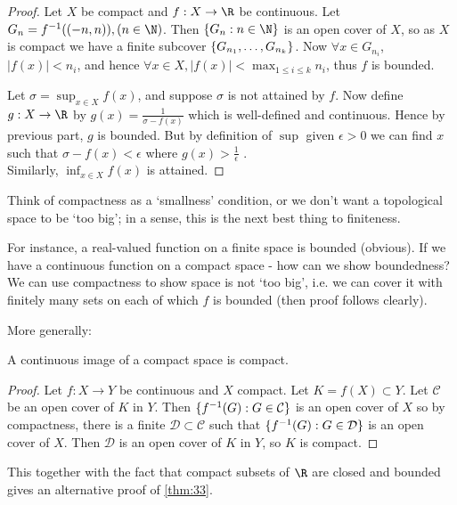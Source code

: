 \begin{proof}
Let $X$ be compact and $f:X \to \R$ be continuous. Let $G_n = f\inv((-n,n)) , (n\in \N)$. Then $\Set{G_n}{n\in \N}$ is an open cover of $X$, so as $X$ is compact we have a finite subcover $\{G_{n_1},\dots, G_{n_k}\}$. Now $\forall x\in G_{n_i}$, $|f(x)| < n_i$, and hence $\forall x\in X, |f(x)| < \max_{1 \leq i  \leq k} n_i$, thus $f$ is bounded.

Let $\sigma = \sup_{x\in X} f(x)$, and suppose $\sigma$ is not attained by $f$. Now define $g: X \to \R$ by $g(x) = \frac{1}{\sigma-f(x)}$ which is well-defined and continuous. Hence by previous part, $g$ is bounded. But by definition of $\sup$ given $\epsilon>0$ we can find $x$ such that $\sigma - f(x)< \epsilon$ where $g(x) > \frac{1}{\epsilon}$ \Lightning. \\
Similarly, $\inf_{x\in X} f(x)$ is attained.
\end{proof}

\begin{remark}
Think of compactness as a `smallness' condition, or we don't want a topological space to be `too big'; in a sense, this is the next best thing to finiteness.

For instance, a real-valued function on a finite space is bounded (obvious). If we have a continuous function on a compact space - how can we show boundedness? We can use compactness to show space is not `too big', i.e. we can cover it with finitely many sets on each of which $f$ is bounded (then proof follows clearly).
\end{remark}

More generally:
\begin{theorem} \label{thm:34}      
A continuous image of a compact space is compact.
\end{theorem}

\begin{proof} 
Let $f: X \to Y$ be continuous and $X$ compact. Let $K=f(X)\subset Y$. Let $\mathcal{C}$ be an open cover of $K$ in $Y$. Then $\{f^{-1} (G) : G\in \mathcal{C}\}$ is an open cover of $X$ so by compactness, there is a finite $\mathcal{D}\subset\mathcal{C}$ such that $\{f^{-1} (G) : G\in \mathcal{D}\}$ is an open cover of $X$. Then $\mathcal{D}$ is an open cover of $K$ in $Y$, so $K$ is compact.
\end{proof}

\begin{remark}
This together with the fact that compact subsets of $\R$ are closed and bounded gives an alternative proof of \cref{thm:33}.
\end{remark}

